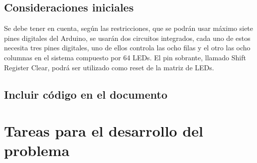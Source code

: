 \documentclass{article}
\begin{document}
\subsection{Consideraciones iniciales}
Se debe tener en cuenta, según las restricciones, que se podrán usar máximo siete pines digitales del Arduino, se usarán dos circuitos integrados, cada uno de estos necesita tres pines digitales, uno de ellos controla las ocho filas y el otro las ocho columnas en el sistema compuesto por 64 LEDs. El pin sobrante, llamado Shift Register Clear, podrá ser utilizado como reset de la matriz de LEDs.


\subsection{Incluir código en el documento}
\section{Tareas para el desarrollo del problema} \label{imagenes}
\end{document}
